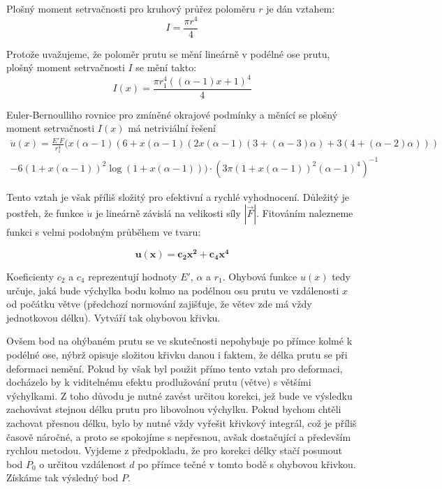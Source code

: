 Plošný moment setrvačnosti pro kruhový průřez poloměru $r$ je dán vztahem:
\begin{equation}
I = \frac{\pi r^4}{4}
\end{equation}

Protože uvažujeme, že poloměr prutu se mění lineárně v podélné ose prutu, plošný moment setrvačnosti $I$ se mění takto:
\begin{equation}
I(x) = \frac{\pi r_{1}^4((\alpha -1)x + 1)^4}{4}
\end{equation}

Euler-Bernoulliho rovnice pro zmíněné okrajové podmínky a měnící se plošný moment setrvačnosti $I(x)$ má netriviální řešení
\begin{multline}
\dot{u}(x)=\frac{{E}'F}{r_{1}^4}(x(\alpha-1)(6+x(\alpha-1)(2x(\alpha-1)(3+(\alpha-3)\alpha)+3(4+(\alpha-2)\alpha)))\\
 - 6 (1+x(\alpha-1))^2 \log (1+x(\alpha-1))) \cdot  (3\pi(1+x(\alpha-1))^2(\alpha-1)^4)^{-1}
\end{multline}

Tento vztah je však příliš složitý pro efektivní a rychlé vyhodnocení. Důležitý je postřeh, že funkce $\dot{u}$ je lineárně závislá na velikosti síly $|\vec{F}|$. Fitováním nalezneme funkci s velmi podobným průběhem ve tvaru:

\begin{equation}
\label{eq:bendFunction}\mathbf{
u(x) = c_2 x^2 + c_4 x^4}
\end{equation}

Koeficienty $c_2$ a $c_4$ reprezentují hodnoty ${E}'$, $\alpha$ a $r_1$. Ohybová funkce $u(x)$ tedy určuje, jaká bude výchylka bodu kolmo na podélnou osu prutu ve vzdálenosti $x$ od počátku větve (předchozí normování zajišťuje, že větev zde má vždy jednotkovou délku). Vytváří tak ohybovou křivku.

Ovšem bod na ohýbaném prutu se ve skutečnosti nepohybuje po přímce kolmé k podélné ose, nýbrž opisuje složitou křivku danou i faktem, že délka prutu se při deformaci nemění. Pokud by však byl použit přímo tento vztah pro deformaci, docházelo by k viditelnému efektu prodlužování prutu (větve) s většími výchylkami. Z toho důvodu je nutné zavést určitou korekci, jež bude ve výsledku zachovávat stejnou délku prutu pro libovolnou výchylku. Pokud bychom chtěli zachovat přesnou délku, bylo by nutné vždy vyřešit křivkový integrál, což je příliš časově náročné, a proto se spokojíme s nepřesnou, avšak dostačující a především rychlou metodou.
Vyjdeme z předpokladu, že pro korekci délky stačí posunout bod $P_0$ o určitou vzdálenost $d$ po přímce tečné v tomto bodě s ohybovou křivkou. Získáme tak výsledný bod $P$. 

